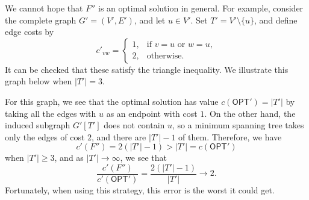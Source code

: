 We cannot hope that $F''$ is an optimal solution in general. For example, 
consider the complete graph $G' = (V', E')$, and let $u \in V'$. Set 
$T' = V' \setminus \{u\}$, and define edge costs by 
\[ c'_{vw} = \begin{cases}
    1, & \text{if } v=u \text{ or } w=u, \\ 
    2, & \text{otherwise.}
\end{cases} \] 
It can be checked that these satisfy the triangle inequality. We illustrate 
this graph below when $|T'| = 3$. 
\begin{center}
\end{center}\vspace{-0.25cm}
For this graph, we see that the optimal solution has value $c(\textsf{OPT}') = 
|T'|$ by taking all the edges with $u$ as an endpoint with cost $1$. 
On the other hand, the induced subgraph $G'[T']$ does not contain $u$, 
so a minimum spanning tree takes only the edges of cost $2$, and there are 
$|T'| - 1$ of them. Therefore, we have 
\[ c'(F'') = 2(|T'| - 1) > |T'| = c(\textsf{OPT}') \] 
when $|T'| \geq 3$, and as $|T'| \to \infty$, we see that 
\[ \frac{c'(F'')}{c'(\textsf{OPT}')} = \frac{2(|T'| - 1)}{|T'|} \to 2. \] 
Fortunately, when using this strategy, this error is the worst it could get.

